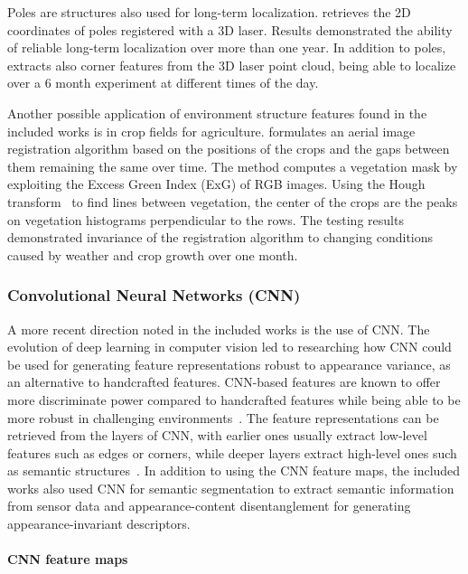 Poles are structures also used for long-term localization.
\cite{schaefer-et-al:2021:103709} retrieves the 2D coordinates of poles registered with a 3D laser. Results demonstrated the ability of reliable long-term localization over more than one year.
In addition to poles, \cite{berrio-et-al:2019:8814289} extracts also corner features from the 3D laser point cloud, being able to localize over a 6 month experiment at different times of the day.

Another possible application of environment structure features found in the included works is in crop fields for agriculture.
\cite{chebrolu-et-al:2018:2849603} formulates an aerial image registration algorithm based on the positions of the crops and the gaps between them remaining the same over time. The method computes a vegetation mask by exploiting the Excess Green Index (ExG) of RGB images. Using the Hough transform~\parencite{original:hough} to find lines between vegetation, the center of the crops are the peaks on vegetation histograms perpendicular to the rows.
The testing results demonstrated invariance of the registration algorithm to changing conditions caused by weather and crop growth over one month.



\subsubsection{Convolutional Neural Networks (CNN)}
\label{sec:discussion:appearance:cnn}

A more recent direction noted in the included works is the use of CNN.
The evolution of deep learning in computer vision led to researching how CNN could be used for generating feature representations robust to appearance variance, as an alternative to handcrafted features.
CNN-based features are known to offer more discriminate power compared to handcrafted features while being able to be more robust in challenging environments~\parencite{taisho-kanji:2016:7866383}.
The feature representations can be retrieved from the layers of CNN, with earlier ones usually extract low-level features such as edges or corners, while deeper layers extract high-level ones such as semantic structures~\parencite{chen-et-al:2018:2859916}.
In addition to using the CNN feature maps, the included works also used CNN for semantic segmentation to extract semantic information from sensor data and appearance-content disentanglement for generating appearance-invariant descriptors.


\paragraph{CNN feature maps}


